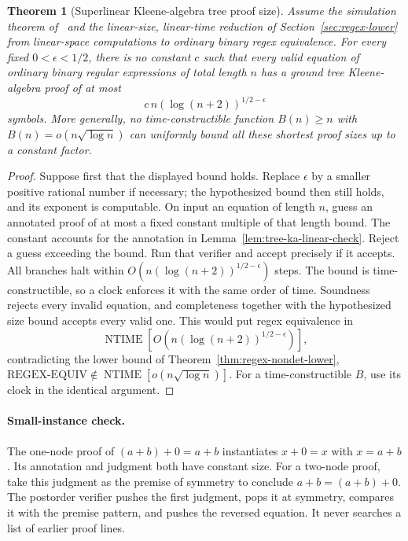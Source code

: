 \documentclass[11pt]{article}
\newtheorem{theorem}{Theorem}[section]
\theoremstyle{definition}
\theoremstyle{remark}
\begin{document}
\begin{theorem}[Superlinear Kleene-algebra tree proof size]
\label{thm:ka-tree-superlinear}
Assume the simulation theorem of~\cite{Cruz26} and the linear-size,
linear-time reduction of Section~\ref{sec:regex-lower} from
linear-space computations to ordinary binary regex equivalence.
For every fixed $0<\epsilon<1/2$, there
is no constant $c$ such that every valid equation of ordinary binary
regular expressions of total length $n$ has a ground tree
Kleene-algebra proof of at most
\[
 c\,n(\log(n+2))^{1/2-\epsilon}
\]
symbols. More generally, no time-constructible function
$B(n)\ge n$ with $B(n)=o(n\sqrt{\log n})$ can uniformly bound
all these shortest proof sizes up to a constant factor.
\end{theorem}

\begin{proof}
Suppose first that the displayed bound holds. Replace $\epsilon$
by a smaller positive rational number if necessary; the hypothesized
bound then still holds, and its exponent is computable. On input an equation
of length $n$, guess an annotated proof of at most a fixed constant
multiple of that length bound. The constant accounts for the
annotation in Lemma~\ref{lem:tree-ka-linear-check}. Reject a guess
exceeding the bound. Run that verifier and accept precisely if it
accepts. All branches halt within
$O(n(\log(n+2))^{1/2-\epsilon})$ steps. The bound is
time-constructible, so a clock enforces it with the same order of
time. Soundness rejects every invalid equation, and completeness
together with the hypothesized size bound accepts every valid one.
This would put regex equivalence in
\[
 \operatorname{NTIME}
   [O(n(\log(n+2))^{1/2-\epsilon})],
\]
contradicting the lower bound of Theorem~\ref{thm:regex-nondet-lower},
$\mathrm{REGEX\mbox{-}EQUIV}\notin
\operatorname{NTIME}[o(n\sqrt{\log n})]$.
For a time-constructible $B$, use its clock in the identical argument.
\end{proof}

\paragraph{Small-instance check.}
The one-node proof of $(a+b)+0=a+b$ instantiates $x+0=x$
with $x=a+b$. Its annotation and judgment both have constant size.
For a two-node proof, take this judgment as the premise of symmetry
to conclude $a+b=(a+b)+0$. The postorder verifier pushes the first
judgment, pops it at symmetry, compares it with the premise pattern,
and pushes the reversed equation. It never searches a list of earlier
proof lines.
\end{document}
